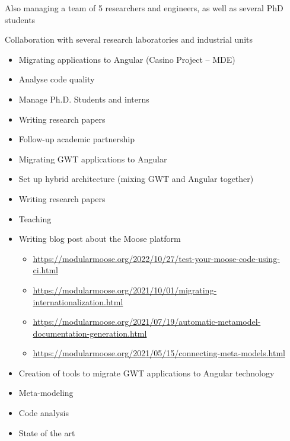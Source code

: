 \documentclass[10pt,a4paper,ragged2e,withhyper]{altacv}
\begin{document}
Also managing a team of 5 researchers and engineers, as well as several PhD students

Collaboration with several research laboratories and industrial units

\divider


\begin{itemize}
  \item Migrating applications to Angular (Casino Project -- MDE)
  \item Analyse code quality 
  \item Manage Ph.D. Students and interns
  \item Writing research papers
  \item Follow-up academic partnership
\end{itemize}

\divider


\begin{itemize}
  \item Migrating GWT applications to Angular
  \item Set up hybrid architecture (mixing GWT and Angular together)
  \item Writing research papers
  \item Teaching
  \item Writing blog post about the Moose platform
  \begin{itemize}
    \item \url{https://modularmoose.org/2022/10/27/test-your-moose-code-using-ci.html}
    \item \url{https://modularmoose.org/2021/10/01/migrating-internationalization.html}
    \item \url{https://modularmoose.org/2021/07/19/automatic-metamodel-documentation-generation.html}
    \item \url{https://modularmoose.org/2021/05/15/connecting-meta-models.html}
  \end{itemize}
\end{itemize}

\divider


\begin{itemize}
  \item Creation of tools to migrate GWT applications to Angular technology
  \item Meta-modeling
  \item Code analysis
  \item State of the art
\end{itemize}
\end{document}
